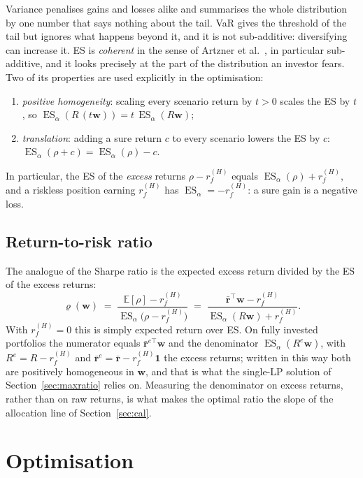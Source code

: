 \documentclass[11pt,a4paper]{article}
\newcommand{\ES}{\operatorname{ES}}
\newcommand{\E}{\mathbb{E}}
\newcommand{\w}{\mathbf{w}}
\newcommand{\rr}{\mathbf{r}}
\newcommand{\ones}{\mathbf{1}}
\theoremstyle{plain}
\theoremstyle{remark}
\begin{document}
Variance penalises gains and losses alike and summarises the whole
distribution by one number that says nothing about the tail. VaR gives the
threshold of the tail but ignores what happens beyond it, and it is not
sub-additive: diversifying can increase it. ES is \emph{coherent} in the
sense of Artzner et al.\ \cite{adeh}, in particular sub-additive, and it
looks precisely at the part of the distribution an investor fears. Two of
its properties are used explicitly in the optimisation:
\begin{enumerate}[nosep]
  \item \emph{positive homogeneity}: scaling every scenario return by $t > 0$
        scales the ES by $t$, so $\ES_\alpha(R\,(t\w)) = t\,\ES_\alpha(R\w)$;
  \item \emph{translation}: adding a sure return $c$ to every scenario lowers
        the ES by $c$: $\ES_\alpha(\rho + c) = \ES_\alpha(\rho) - c$.
\end{enumerate}
In particular, the ES of the \emph{excess} returns $\rho - r_f^{(H)}$ equals
$\ES_\alpha(\rho) + r_f^{(H)}$, and a riskless position earning $r_f^{(H)}$
has $\ES_\alpha = -r_f^{(H)}$: a sure gain is a negative loss.

\subsection{Return-to-risk ratio}

The analogue of the Sharpe ratio is the expected excess return divided by
the ES of the excess returns:
\begin{equation}
  \varrho(\w) \;=\; \frac{\E[\rho] - r_f^{(H)}}{\ES_\alpha\bigl(\rho - r_f^{(H)}\bigr)}
  \;=\; \frac{\bar{\rr}^\top \w - r_f^{(H)}}{\ES_\alpha(R\w) + r_f^{(H)}} .
  \label{eq:ratio}
\end{equation}
With $r_f^{(H)} = 0$ this is simply expected return over ES. On fully
invested portfolios the numerator equals $\bar{\rr}^{e\top}\w$ and the
denominator $\ES_\alpha(R^{e}\w)$, with $R^{e} = R - r_f^{(H)}$ and
$\bar{\rr}^{e} = \bar{\rr} - r_f^{(H)}\ones$ the excess returns; written in
this way both are positively homogeneous in $\w$, and that is what the
single-LP solution of Section~\ref{sec:maxratio} relies on. Measuring the
denominator on excess returns, rather than on raw returns, is what makes the
optimal ratio the slope of the allocation line of Section~\ref{sec:cal}.

\section{Optimisation}
\label{sec:lp}
\end{document}
